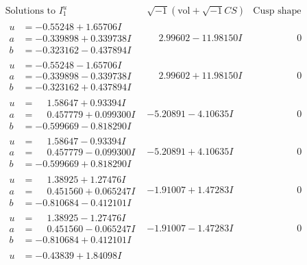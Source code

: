 \documentclass[1p]{elsarticle_modified}
\theoremstyle{definition}
\newcommand{\I}{\sqrt{-1}}
\begin{document}
$$\begin{array}{c|c|c}
\text{Solutions to }I^u_{1}& \I (\text{vol} + \sqrt{-1}CS) & \text{Cusp shape}\\
 \hline 
\begin{aligned}
u &= -0.55248 + 1.65706 I \\
a &= -0.339898 + 0.339738 I \\
b &= -0.323162 - 0.437894 I\end{aligned}
 & \phantom{-}2.99602 - 11.98150 I & \phantom{-0.000000 } 0 \\ \hline\begin{aligned}
u &= -0.55248 - 1.65706 I \\
a &= -0.339898 - 0.339738 I \\
b &= -0.323162 + 0.437894 I\end{aligned}
 & \phantom{-}2.99602 + 11.98150 I & \phantom{-0.000000 } 0 \\ \hline\begin{aligned}
u &= \phantom{-}1.58647 + 0.93394 I \\
a &= \phantom{-}0.457779 + 0.099300 I \\
b &= -0.599669 - 0.818290 I\end{aligned}
 & -5.20891 - 4.10635 I & \phantom{-0.000000 } 0 \\ \hline\begin{aligned}
u &= \phantom{-}1.58647 - 0.93394 I \\
a &= \phantom{-}0.457779 - 0.099300 I \\
b &= -0.599669 + 0.818290 I\end{aligned}
 & -5.20891 + 4.10635 I & \phantom{-0.000000 } 0 \\ \hline\begin{aligned}
u &= \phantom{-}1.38925 + 1.27476 I \\
a &= \phantom{-}0.451560 + 0.065247 I \\
b &= -0.810684 - 0.412101 I\end{aligned}
 & -1.91007 + 1.47283 I & \phantom{-0.000000 } 0 \\ \hline\begin{aligned}
u &= \phantom{-}1.38925 - 1.27476 I \\
a &= \phantom{-}0.451560 - 0.065247 I \\
b &= -0.810684 + 0.412101 I\end{aligned}
 & -1.91007 - 1.47283 I & \phantom{-0.000000 } 0 \\ \hline\begin{aligned}
u &= -0.43839 + 1.84098 I \\

\end{aligned}
\end{array}$$
\end{document}
